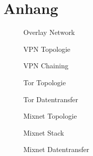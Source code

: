 \section{Anhang}

\begin{figure}[!ht]
    \centering
    
    \caption{Overlay Network}
\end{figure}
\begin{figure}[!ht]
    \centering
    
    \caption{VPN Topologie}
\end{figure}
\begin{figure}[!hb]
    \centering
    
    \caption{VPN Chaining}
\end{figure}
\begin{figure}[!ht]
    \centering
    
    \caption{Tor Topologie}
\end{figure}
\begin{figure}[!hb]
    \centering
    
    \caption{Tor Datentransfer}
\end{figure}
\begin{figure}[!ht]
    \centering
    
    \caption{Mixnet Topologie}
\end{figure}
\begin{figure}[!ht]
    \centering
    
    \caption{Mixnet Stack}
\end{figure}
\begin{figure}[!hb]
    \centering
    
    \caption{Mixnet Datentransfer}
\end{figure}